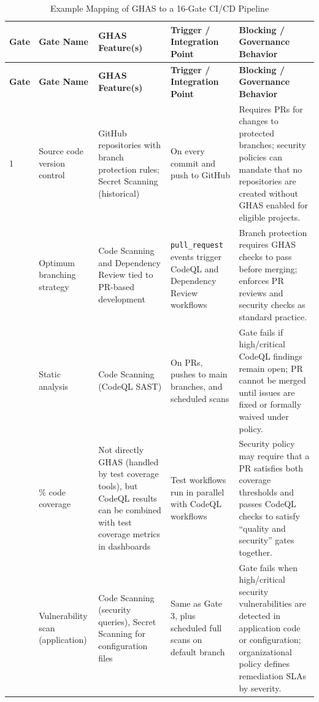 \documentclass[11pt]{article}
\begin{document}
\begin{longtable}{%
  >{\raggedright\arraybackslash}p{1cm}%
  >{\raggedright\arraybackslash}p{3.5cm}%
  >{\raggedright\arraybackslash}p{3.5cm}%
  >{\raggedright\arraybackslash}p{3.5cm}%
  >{\raggedright\arraybackslash}p{3.5cm}%
}
\caption{Example Mapping of GHAS to a 16-Gate CI/CD Pipeline}
\label{tab:ghas-16-gates}\\
\toprule
\textbf{Gate} & \textbf{Gate Name} & \textbf{GHAS Feature(s)} & \textbf{Trigger / Integration Point} & \textbf{Blocking / Governance Behavior} \\
\midrule
\endfirsthead

\toprule
\textbf{Gate} & \textbf{Gate Name} & \textbf{GHAS Feature(s)} & \textbf{Trigger / Integration Point} & \textbf{Blocking / Governance Behavior} \\
\midrule
\endhead

1 & Source code version control &
GitHub repositories with branch protection rules; Secret Scanning (historical) &
On every commit and push to GitHub &
Requires PRs for changes to protected branches; security policies can mandate that no repositories are created without GHAS enabled for eligible projects. \\[0.5em]

2 & Optimum branching strategy &
Code Scanning and Dependency Review tied to PR-based development &
\texttt{pull\_request} events trigger CodeQL and Dependency Review workflows &
Branch protection requires GHAS checks to pass before merging; enforces PR reviews and security checks as standard practice. \\[0.5em]

3 & Static analysis &
Code Scanning (CodeQL SAST) &
On PRs, pushes to main branches, and scheduled scans &
Gate fails if high/critical CodeQL findings remain open; PR cannot be merged until issues are fixed or formally waived under policy. \\[0.5em]

4 & 80\% code coverage &
Not directly GHAS (handled by test coverage tools), but CodeQL results can be combined with test coverage metrics in dashboards &
Test workflows run in parallel with CodeQL workflows &
Security policy may require that a PR satisfies both coverage thresholds and passes CodeQL checks to satisfy ``quality and security'' gates together. \\[0.5em]

5 & Vulnerability scan (application) &
Code Scanning (security queries), Secret Scanning for configuration files &
Same as Gate 3, plus scheduled full scans on default branch &
Gate fails when high/critical security vulnerabilities are detected in application code or configuration; organizational policy defines remediation SLAs by severity. \\[0.5em]


\end{longtable}
\end{document}
